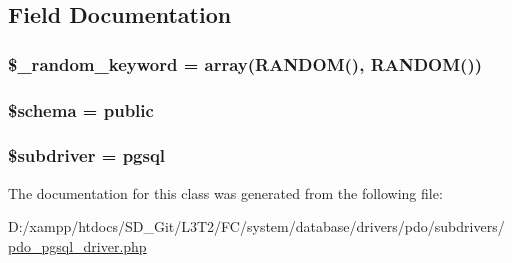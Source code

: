 \subsection{Field Documentation}
\hypertarget{class_c_i___d_b__pdo__pgsql__driver_a10213aa6e05f6d924d3277bb1d2fea00}{}
\subsubsection[{\$\+\_\+random\+\_\+keyword}]{\setlength{\rightskip}{0pt plus 5cm}\$\+\_\+random\+\_\+keyword = array(\textquotesingle{}R\+A\+N\+D\+O\+M()\textquotesingle{}, \textquotesingle{}R\+A\+N\+D\+O\+M()\textquotesingle{})\hspace{0.3cm}{\ttfamily [protected]}}\label{class_c_i___d_b__pdo__pgsql__driver_a10213aa6e05f6d924d3277bb1d2fea00}
\hypertarget{class_c_i___d_b__pdo__pgsql__driver_a83022b1d70799d2bde3d64dca9cb40ee}{}
\subsubsection[{\$schema}]{\setlength{\rightskip}{0pt plus 5cm}\$schema = \textquotesingle{}public\textquotesingle{}}\label{class_c_i___d_b__pdo__pgsql__driver_a83022b1d70799d2bde3d64dca9cb40ee}
\hypertarget{class_c_i___d_b__pdo__pgsql__driver_a1322ca756348b11d080cb7a4f590de15}{}
\subsubsection[{\$subdriver}]{\setlength{\rightskip}{0pt plus 5cm}\$subdriver = \textquotesingle{}pgsql\textquotesingle{}}\label{class_c_i___d_b__pdo__pgsql__driver_a1322ca756348b11d080cb7a4f590de15}


The documentation for this class was generated from the following file\+:\begin{DoxyCompactItemize}
\item 
D\+:/xampp/htdocs/\+S\+D\+\_\+\+Git/\+L3\+T2/\+F\+C/system/database/drivers/pdo/subdrivers/\hyperlink{pdo__pgsql__driver_8php}{pdo\+\_\+pgsql\+\_\+driver.\+php}\end{DoxyCompactItemize}
